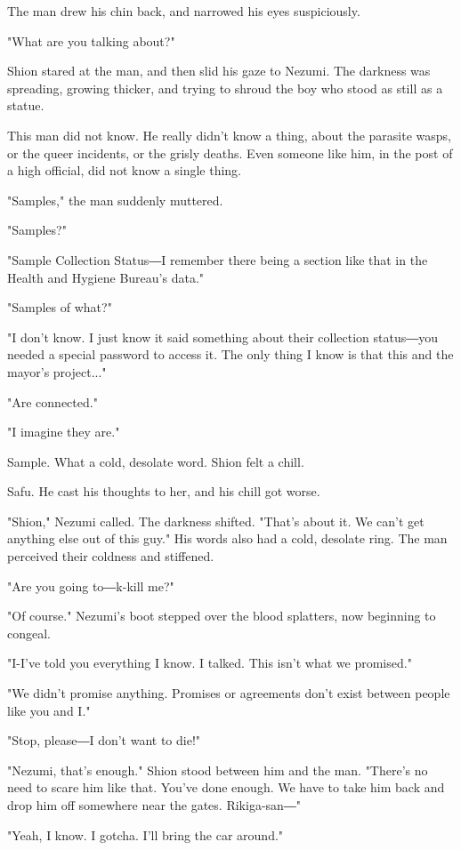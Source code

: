 The man drew his chin back, and narrowed his eyes suspiciously.

"What are you talking about?"

Shion stared at the man, and then slid his gaze to Nezumi. The darkness
was spreading, growing thicker, and trying to shroud the boy who stood
as still as a statue.

This man did not know. He really didn't know a thing, about the parasite
wasps, or the queer incidents, or the grisly deaths. Even someone like
him, in the post of a high official, did not know a single thing.

"Samples," the man suddenly muttered.

"Samples?"

"Sample Collection Status―I remember there being a section like that in
the Health and Hygiene Bureau's data."

"Samples of what?"

"I don't know. I just know it said something about their collection
status―you needed a special password to access it. The only thing I know
is that this and the mayor's project..."

"Are connected."

"I imagine they are."

Sample. What a cold, desolate word. Shion felt a chill.

Safu. He cast his thoughts to her, and his chill got worse.

"Shion," Nezumi called. The darkness shifted. "That's about it. We can't
get anything else out of this guy." His words also had a cold, desolate
ring. The man perceived their coldness and stiffened.

"Are you going to―k-kill me?"~

"Of course." Nezumi's boot stepped over the blood splatters, now
beginning to congeal.

"I-I've told you everything I know. I talked. This isn't what we
promised."

"We didn't promise anything. Promises or agreements don't exist between
people like you and I."

"Stop, please―I don't want to die!"

"Nezumi, that's enough." Shion stood between him and the man. "There's
no need to scare him like that. You've done enough. We have to take him
back and drop him off somewhere near the gates. Rikiga-san―"

"Yeah, I know. I gotcha. I'll bring the car around."

